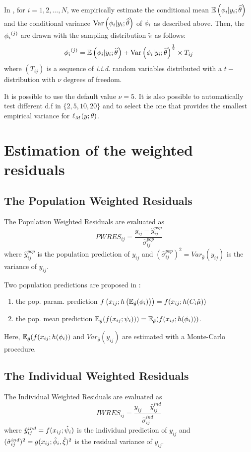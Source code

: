 In \monolix, for $i=1,2,\ldots, N$, we empirically estimate the
conditional mean $\mathbb{E}\left({{\phi}_i}|y_{i};{\widehat{\theta}}\right)$ and the conditional
variance $\mbox{Var}\left({{\phi}_i}|y_{i};{\widehat{\theta}}\right)$ of ${{\phi}_i}$ as described
above. Then, the ${{\phi}_i}^{(j)}$ are drawn with the sampling
distribution $\tilde{\pi}$ as follows:
$${{\phi}_i}^{(j)} = \mathbb{E}\left({{\phi}_i}|y_{i};{\widehat{\theta}}\right) + \mbox{Var}\left({{\phi}_i}|y_{i};{\widehat{\theta}}\right)^{\frac{1}{2}} \times T_{ij}$$
where $(T_{ij})$ is a sequence of {\it i.i.d.} random variables distributed with a $t-$distribution with $\nu$ degrees of freedom.

It is possible to use the default value $\nu=5$. It is also possible
to automatically test different d.f in $\{2, 5, 10, 20\}$ and to
select the one that provides the smallest empirical variance for
$\ell_M(y;{\theta})$.


\section{Estimation of the weighted residuals} \label{section_wres}
\subsection{The Population Weighted Residuals}
The Population Weighted Residuals are evaluated as
   $$PWRES_{ij} = \frac{y_{ij} - \hat{y}^{pop}_{ij}}{\hat{\sigma}^{pop}_{ij}}$$
where $\hat{y}^{pop}_{ij}$ is the population prediction of $y_{ij}$ and $(\hat{\sigma}^{pop}_{ij})^2=Var_{\hat{\theta}}(y_{ij})$ is the variance of $y_{ij}$.

Two population predictions are proposed in \monolix:
\begin{enumerate}
  \item the {pop. param. prediction} $f\left(x_{ij} ; h\left( \mathbb{E}_{\hat{\theta}}(\phigi) \right) \right)= f(x_{ij} ; h(C_i \hat{\fixed_effect}))$
  \item the {pop. mean prediction}  $\mathbb{E}_{\hat{\theta}}(f(x_{ij} ; {\psi_i}) ))=\mathbb{E}_{\hat{\theta}}(f(x_{ij} ; h({{\phi}_i}) ))$.
\end{enumerate}

Here,  $\mathbb{E}_{\hat{\theta}}(f(x_{ij} ; h({{\phi}_i})  )$ and
$Var_{\hat{\theta}}(y_{ij})$ are estimated with a Monte-Carlo procedure.

\subsection{The Individual Weighted Residuals}
The Individual Weighted Residuals are evaluated as
$$IWRES_{ij} = \frac{y_{ij} - \hat{y}^{ind}_{ij}} {\hat{\sigma}^{ind}_{ij}}$$
where  $\hat{y}^{ind}_{ij} = f(x_{ij} ; \hat{\psi}_i )$ is the individual prediction of $y_{ij}$ and $(\hat{\sigma}^{ind}_{ij})^2 = g(x_{ij} ; \hat{{\phi}}_i,\hat{\xi})^2$ is the residual variance of $y_{ij}$.

